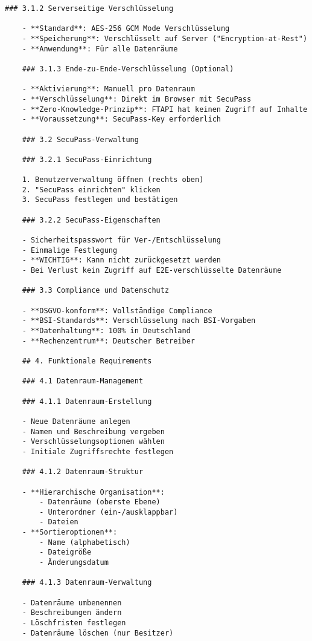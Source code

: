 \begin{Verbatim}[breaklines=true]
    ### 3.1.2 Serverseitige Verschlüsselung
    
    - **Standard**: AES-256 GCM Mode Verschlüsselung
    - **Speicherung**: Verschlüsselt auf Server ("Encryption-at-Rest")
    - **Anwendung**: Für alle Datenräume
    
    ### 3.1.3 Ende-zu-Ende-Verschlüsselung (Optional)
    
    - **Aktivierung**: Manuell pro Datenraum
    - **Verschlüsselung**: Direkt im Browser mit SecuPass
    - **Zero-Knowledge-Prinzip**: FTAPI hat keinen Zugriff auf Inhalte
    - **Voraussetzung**: SecuPass-Key erforderlich
    
    ### 3.2 SecuPass-Verwaltung
    
    ### 3.2.1 SecuPass-Einrichtung
    
    1. Benutzerverwaltung öffnen (rechts oben)
    2. "SecuPass einrichten" klicken
    3. SecuPass festlegen und bestätigen
    
    ### 3.2.2 SecuPass-Eigenschaften
    
    - Sicherheitspasswort für Ver-/Entschlüsselung
    - Einmalige Festlegung
    - **WICHTIG**: Kann nicht zurückgesetzt werden
    - Bei Verlust kein Zugriff auf E2E-verschlüsselte Datenräume
    
    ### 3.3 Compliance und Datenschutz
    
    - **DSGVO-konform**: Vollständige Compliance
    - **BSI-Standards**: Verschlüsselung nach BSI-Vorgaben
    - **Datenhaltung**: 100% in Deutschland
    - **Rechenzentrum**: Deutscher Betreiber
    
    ## 4. Funktionale Requirements
    
    ### 4.1 Datenraum-Management
    
    ### 4.1.1 Datenraum-Erstellung
    
    - Neue Datenräume anlegen
    - Namen und Beschreibung vergeben
    - Verschlüsselungsoptionen wählen
    - Initiale Zugriffsrechte festlegen
    
    ### 4.1.2 Datenraum-Struktur
    
    - **Hierarchische Organisation**:
        - Datenräume (oberste Ebene)
        - Unterordner (ein-/ausklappbar)
        - Dateien
    - **Sortieroptionen**:
        - Name (alphabetisch)
        - Dateigröße
        - Änderungsdatum
    
    ### 4.1.3 Datenraum-Verwaltung
    
    - Datenräume umbenennen
    - Beschreibungen ändern
    - Löschfristen festlegen
    - Datenräume löschen (nur Besitzer)
    

\end{Verbatim}
